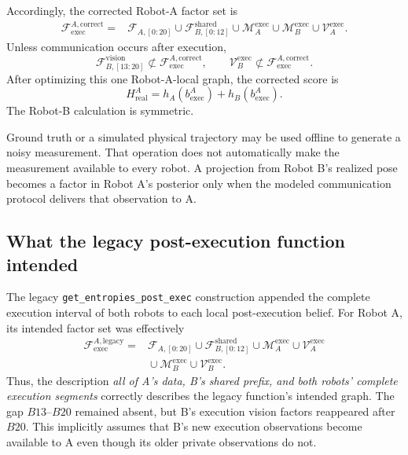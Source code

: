 \documentclass[11pt,a4paper]{article}
\begin{document}
Accordingly, the corrected Robot-A factor set is
\begin{align}
 \mathcal F_{\mathrm{exec}}^{A,\mathrm{correct}}
 ={}&\mathcal F_{A,[0:20]}
 \cup\mathcal F_{B,[0:12]}^{\mathrm{shared}}
 \cup\mathcal M_A^{\mathrm{exec}}
 \cup\mathcal M_B^{\mathrm{exec}}
 \cup\mathcal V_A^{\mathrm{exec}} .
 \label{eq:correct-a-factor-set}
\end{align}
Unless communication occurs after execution,
\[
 \mathcal F_{B,[13:20]}^{\mathrm{vision}}\not\subset
 \mathcal F_{\mathrm{exec}}^{A,\mathrm{correct}},
 \qquad
 \mathcal V_B^{\mathrm{exec}}\not\subset
 \mathcal F_{\mathrm{exec}}^{A,\mathrm{correct}}.
\]
After optimizing this one Robot-A-local graph, the corrected score is
\[
 H_{\mathrm{real}}^A
 =h_A\!\left(b_{\mathrm{exec}}^A\right)
  +h_B\!\left(b_{\mathrm{exec}}^A\right).
\]
The Robot-B calculation is symmetric.

Ground truth or a simulated physical trajectory may be used offline to
generate a noisy measurement.  That operation does not automatically make
the measurement available to every robot.  A projection from Robot B's
realized pose becomes a factor in Robot A's posterior only when the modeled
communication protocol delivers that observation to A.

\subsection{What the legacy post-execution function intended}

The legacy \texttt{get\_entropies\_post\_exec} construction appended the
complete execution interval of both robots to each local post-execution
belief.  For Robot A, its intended factor set was effectively
\begin{align}
 \mathcal F_{\mathrm{exec}}^{A,\mathrm{legacy}}
 ={}&\mathcal F_{A,[0:20]}
 \cup\mathcal F_{B,[0:12]}^{\mathrm{shared}}
 \cup\mathcal M_A^{\mathrm{exec}}
 \cup\mathcal V_A^{\mathrm{exec}} \nonumber\\
 &{}\cup\mathcal M_B^{\mathrm{exec}}
 \cup\mathcal V_B^{\mathrm{exec}} .
 \label{eq:legacy-a-factor-set}
\end{align}
Thus, the description \emph{all of A's data, B's shared prefix, and both
robots' complete execution segments} correctly describes the legacy
function's intended graph.  The gap $B13$--$B20$ remained absent, but B's
execution vision factors reappeared after $B20$.  This implicitly assumes that
B's new execution observations become available to A even though its older
private observations do not.
\end{document}

